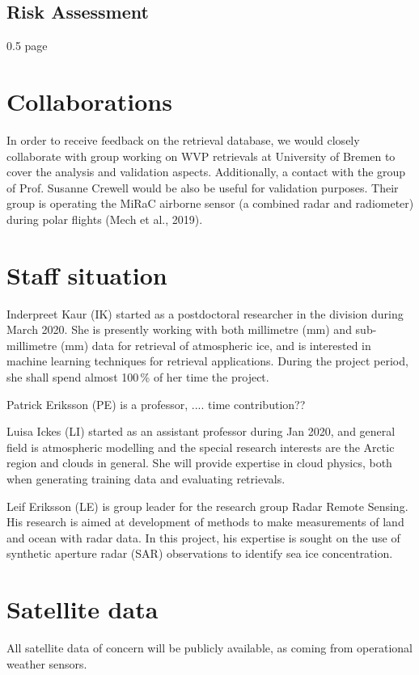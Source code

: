 \documentclass[12pt,oneside,a4paper]{article}
\begin{document}
\subsection{Risk Assessment}
0.5 page

\section{Collaborations}

In order to receive feedback on the retrieval database, we would closely collaborate with group working on WVP retrievals at University of Bremen to cover the analysis and validation aspects. Additionally, a contact with the group of Prof. Susanne Crewell would be also be useful for validation purposes. Their group is operating the MiRaC airborne sensor (a combined radar and radiometer) during polar flights (Mech et al., 2019).


\section{Staff situation}
\label{sec:staff}
%
Inderpreet Kaur (IK) started as a postdoctoral researcher in the division during March 2020.  She is presently working with both millimetre (mm) and sub-millimetre (mm) data for retrieval of atmospheric ice, and is interested in machine learning techniques for retrieval applications. During the project period, she shall spend almost 100\,\% of her time the project. 

Patrick Eriksson (PE) is a professor, .... time contribution??

Luisa Ickes (LI) started as an assistant professor during Jan 2020, and  general field is atmospheric modelling and the special research interests are the Arctic region and clouds in general. She will provide expertise in cloud physics, both when generating training data and evaluating retrievals.

Leif Eriksson (LE) is group leader for the research group Radar Remote Sensing. His research is aimed at development of methods to make measurements of land and ocean with radar data. In this project, his expertise is sought on the use of synthetic aperture radar (SAR) observations to identify sea ice concentration.

\section{Satellite data}
%
All satellite data of concern will be publicly available, as coming from
operational weather sensors.

{\footnotesize
	
}
\end{document}
